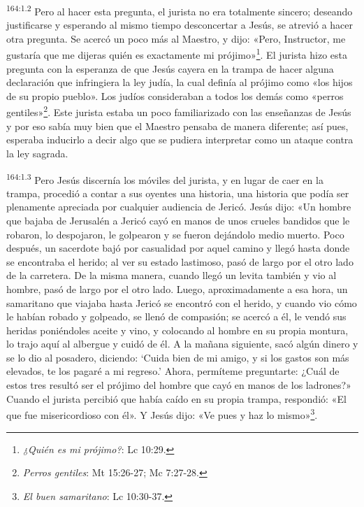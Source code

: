 \par
\textsuperscript{164:1.2} Pero al hacer esta pregunta, el jurista no era totalmente sincero; deseando justificarse y esperando al mismo tiempo desconcertar a Jesús, se atrevió a hacer otra pregunta. Se acercó un poco más al Maestro, y dijo: «Pero, Instructor, me gustaría que me dijeras quién es exactamente mi prójimo»\footnote{\textit{¿Quién es mi prójimo?}: Lc 10:29.}. El jurista hizo esta pregunta con la esperanza de que Jesús cayera en la trampa de hacer alguna declaración que infringiera la ley judía, la cual definía al prójimo como «los hijos de su propio pueblo». Los judíos consideraban a todos los demás como «perros gentiles»\footnote{\textit{Perros gentiles}: Mt 15:26-27; Mc 7:27-28.}. Este jurista estaba un poco familiarizado con las enseñanzas de Jesús y por eso sabía muy bien que el Maestro pensaba de manera diferente; así pues, esperaba inducirlo a decir algo que se pudiera interpretar como un ataque contra la ley sagrada.

\par
\textsuperscript{164:1.3} Pero Jesús discernía los móviles del jurista, y en lugar de caer en la trampa, procedió a contar a sus oyentes una historia, una historia que podía ser plenamente apreciada por cualquier audiencia de Jericó. Jesús dijo: «Un hombre que bajaba de Jerusalén a Jericó cayó en manos de unos crueles bandidos que le robaron, lo despojaron, le golpearon y se fueron dejándolo medio muerto. Poco después, un sacerdote bajó por casualidad por aquel camino y llegó hasta donde se encontraba el herido; al ver su estado lastimoso, pasó de largo por el otro lado de la carretera. De la misma manera, cuando llegó un levita también y vio al hombre, pasó de largo por el otro lado. Luego, aproximadamente a esa hora, un samaritano que viajaba hasta Jericó se encontró con el herido, y cuando vio cómo le habían robado y golpeado, se llenó de compasión; se acercó a él, le vendó sus heridas poniéndoles aceite y vino, y colocando al hombre en su propia montura, lo trajo aquí al albergue y cuidó de él. A la mañana siguiente, sacó algún dinero y se lo dio al posadero, diciendo: `Cuida bien de mi amigo, y si los gastos son más elevados, te los pagaré a mi regreso.' Ahora, permíteme preguntarte: ¿Cuál de estos tres resultó ser el prójimo del hombre que cayó en manos de los ladrones?» Cuando el jurista percibió que había caído en su propia trampa, respondió: «El que fue misericordioso con él». Y Jesús dijo: «Ve pues y haz lo mismo»\footnote{\textit{El buen samaritano}: Lc 10:30-37.}.

